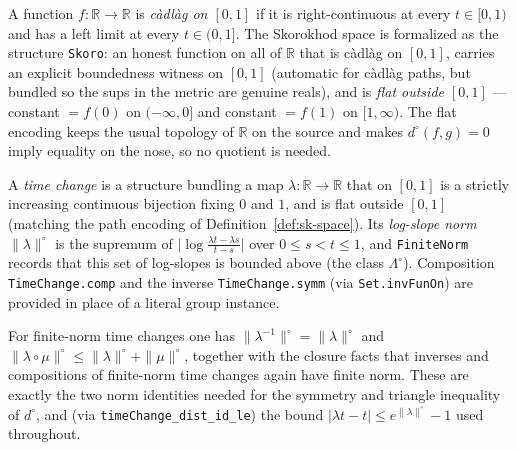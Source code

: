 \begin{definition}\label{def:sk-space}
  \leanok
  A function $f\colon\mathbb{R}\to\mathbb{R}$ is \emph{c\`adl\`ag on $[0,1]$} if it is
  right-continuous at every $t\in[0,1)$ and has a left limit at every $t\in(0,1]$.
  The Skorokhod space is formalized as the structure \texttt{Skoro}: an honest function
  on all of $\mathbb{R}$ that is c\`adl\`ag on $[0,1]$, carries an explicit boundedness
  witness on $[0,1]$ (automatic for c\`adl\`ag paths, but bundled so the sups in the
  metric are genuine reals), and is \emph{flat outside $[0,1]$} --- constant $=f(0)$ on
  $(-\infty,0]$ and constant $=f(1)$ on $[1,\infty)$.  The flat encoding keeps the usual
  topology of $\mathbb{R}$ on the source and makes $d^\circ(f,g)=0$ imply equality on the
  nose, so no quotient is needed.
\end{definition}

\begin{definition}\label{def:sk-timechange}
  \leanok
  A \emph{time change} is a structure bundling a map $\lambda\colon\mathbb{R}\to\mathbb{R}$
  that on $[0,1]$ is a strictly increasing continuous bijection fixing $0$ and $1$, and is
  flat outside $[0,1]$ (matching the path encoding of Definition~\ref{def:sk-space}).
  Its \emph{log-slope norm} $\|\lambda\|^\circ$ is the supremum of
  $\bigl|\log\frac{\lambda t-\lambda s}{t-s}\bigr|$ over $0\le s<t\le 1$, and
  \texttt{FiniteNorm} records that this set of log-slopes is bounded above (the class
  $\Lambda^\circ$).  Composition \texttt{TimeChange.comp} and the inverse
  \texttt{TimeChange.symm} (via \texttt{Set.invFunOn}) are provided in place of a literal
  group instance.
\end{definition}

\begin{lemma}\label{lem:sk-logslope}
  \leanok
  For finite-norm time changes one has $\|\lambda^{-1}\|^\circ=\|\lambda\|^\circ$ and
  $\|\lambda\circ\mu\|^\circ\le\|\lambda\|^\circ+\|\mu\|^\circ$, together with the
  closure facts that inverses and compositions of finite-norm time changes again have
  finite norm.  These are exactly the two norm identities needed for the symmetry and
  triangle inequality of $d^\circ$, and (via
  \texttt{timeChange\_dist\_id\_le}) the bound
  $|\lambda t-t|\le e^{\|\lambda\|^\circ}-1$ used throughout.
\end{lemma}

